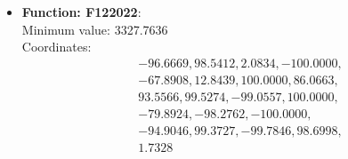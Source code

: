 \documentclass{article}
\begin{document}
\begin{itemize}
  \item \textbf{Function: F122022}: \\
    Minimum value: 3327.7636 \\
    Coordinates:
    \[
      \begin{aligned}
        & -96.6669, 98.5412, 2.0834, -100.0000, \\
        & -67.8908, 12.8439, 100.0000, 86.0663, \\
        & 93.5566, 99.5274, -99.0557, 100.0000, \\
        & -79.8924, -98.2762, -100.0000, \\
        & -94.9046, 99.3727, -99.7846, 98.6998, \\
        & 1.7328
      \end{aligned}
    \]

\end{itemize}

\printbibliography[title={References}]
\end{document}
